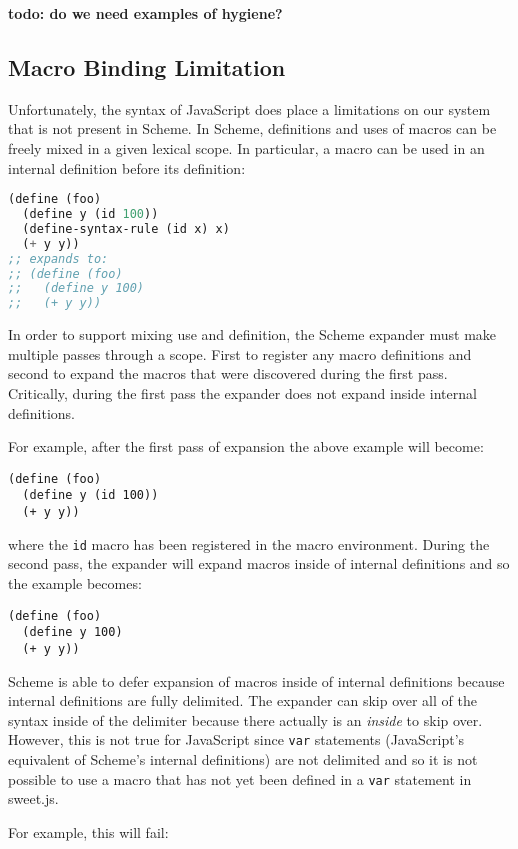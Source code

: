 \documentclass[preprint,10pt]{sigplanconf}
\begin{document}
\textbf{todo: do we need examples of hygiene?}

\subsection{Macro Binding Limitation} 
\label{sec:macroBinding}

Unfortunately, the syntax of JavaScript does place a limitations on
our system that is not present in Scheme. In Scheme, definitions and
uses of macros can be freely mixed in a given lexical scope. In
particular, a macro can be used in an internal definition before its definition:

\begin{lstlisting}[language=lisp]
(define (foo)
  (define y (id 100))
  (define-syntax-rule (id x) x)
  (+ y y))
;; expands to:
;; (define (foo)
;;   (define y 100)
;;   (+ y y))
\end{lstlisting}

In order to support mixing use and definition, the Scheme expander
must make multiple passes through a scope. First to register any macro
definitions and second to expand the macros that were discovered
during the first pass. Critically, during the first pass the expander
does not expand inside internal definitions.

For example, after the first pass of expansion the above example will become:
\begin{lstlisting}
(define (foo)
  (define y (id 100))
  (+ y y))
\end{lstlisting}
where the \lstinline!id! macro has been registered in the macro
environment. During the second pass, the expander will expand macros
inside of internal definitions and so the example becomes:
\begin{lstlisting}
(define (foo)
  (define y 100)
  (+ y y))
\end{lstlisting}

Scheme is able to defer expansion of macros inside of internal
definitions because internal definitions are fully delimited. The
expander can skip over all of the syntax inside of the delimiter
because there actually is an \emph{inside} to skip over. However, this
is not true for JavaScript since \lstinline!var! statements
(JavaScript's equivalent of Scheme's internal definitions) are not
delimited and so it is not possible to use a macro that has not yet
been defined in a \lstinline!var! statement in sweet.js.

For example, this will fail:
\end{document}
